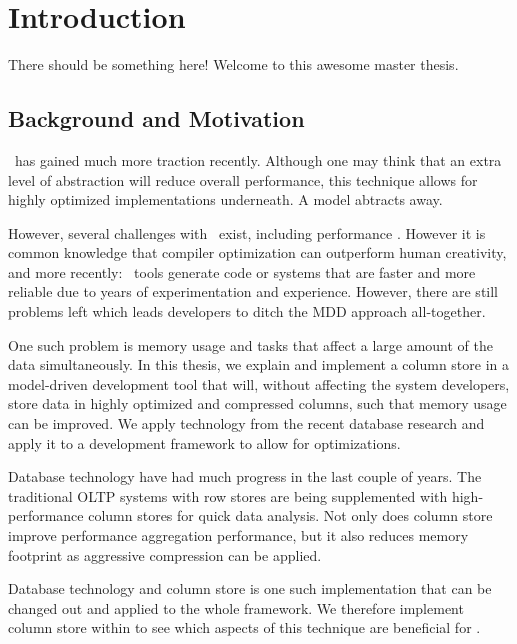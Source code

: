 \chapter{Introduction}
\label{chap:introduction}
There should be something here! Welcome to this awesome master thesis.

\section{Background and Motivation}
\label{sec:Background and Motivation}
\mdd~has gained much more traction recently. Although one may think that an extra level of abstraction will reduce overall performance, this technique allows for highly optimized implementations underneath. A model abtracts away.

However, several challenges with \mdd~exist, including performance \cite{Selic2003-qa}. However it is common knowledge that compiler optimization can outperform human creativity, and more recently: \mdd~tools generate code or systems that are faster and more reliable due to years of experimentation and experience. However, there are still problems left which leads developers to ditch the MDD approach all-together.

One such problem is memory usage and tasks that affect a large amount of the data simultaneously. In this thesis, we explain and implement a column store in a model-driven development tool that will, without affecting the system developers, store data in highly optimized and compressed columns, such that memory usage can be improved. We apply technology from the recent database research and apply it to a development framework to allow for optimizations.

Database technology have had much progress in the last couple of years. The traditional OLTP systems with row stores are being supplemented with high-performance column stores for quick data analysis. Not only does column store improve performance aggregation performance, but it also reduces memory footprint as aggressive compression can be applied.


Database technology and column store is one such implementation that can be changed out and applied to the whole framework. We therefore implement column store within \gap to see which aspects of this technique are beneficial for \mdd.

